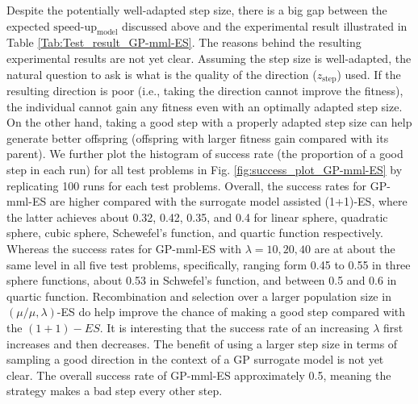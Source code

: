Despite the potentially well-adapted step size, there is a big gap between the expected $\text{speed-up}_{\text{model}}$ discussed above and the experimental result illustrated in Table \ref{Tab:Test_result_GP-mml-ES}. The reasons behind the resulting experimental results are not yet clear. Assuming the step size is well-adapted, the natural question to ask is what is the quality of the direction ($z_{\text{step}}$) used. If the resulting direction is poor (i.e., taking the direction cannot improve the fitness), the individual cannot gain any fitness even with an optimally adapted step size. On the other hand, taking a good step with a properly adapted step size can help generate better offspring (offspring with larger fitness gain compared with its parent). We further plot the histogram of success rate (the proportion of a good step in each run) for all test problems in Fig. \ref{fig:success_plot_GP-mml-ES} by replicating 100 runs for each test problems. Overall, the success rates for GP-mml-ES are higher compared with the surrogate model assisted (1+1)-ES, where the latter achieves about 0.32, 0.42, 0.35, and 0.4 for linear sphere, quadratic sphere, cubic sphere, Schewefel's function, and quartic function respectively. Whereas the success rates for GP-mml-ES with $\lambda=10,20,40$ are at about the same level in all five test problems, specifically, ranging form 0.45 to 0.55 in three sphere functions, about 0.53 in Schwefel's function, and between 0.5 and 0.6 in quartic function. Recombination and selection over a larger population size in $(\mu/\mu,\lambda)$-ES do help improve the chance of making a good step compared with the $(1+1)-ES$. It is interesting that the success rate of an increasing $\lambda$ first increases and then decreases. The benefit of using a larger step size in terms of sampling a good direction in the context of a GP surrogate model is not yet clear. The overall success rate {}of GP-mml-ES approximately 0.5, meaning the strategy makes a bad step every other step. 





